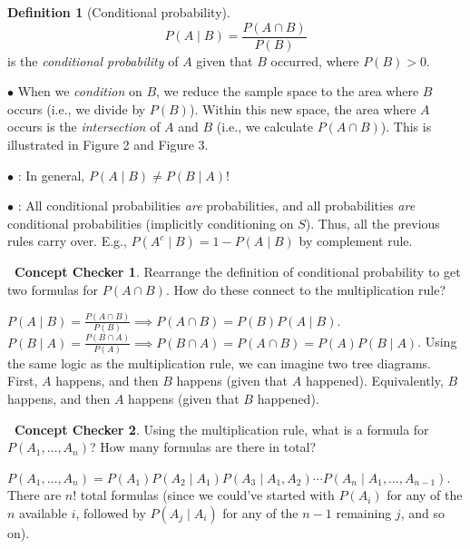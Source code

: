 \documentclass[12pt,oneside]{article}
\newcommand{\tip}{\textbf{\faLightbulb}: }
\newcommand{\warning}{\textbf{\Biohazard}: }
\theoremstyle{definition}
\newtheorem{definition}{Definition}
\newtheorem{concept}{\faPen \ Concept Checker}
\theoremstyle{remark}
\begin{document}
\begin{definition}[Conditional probability]
\[P(A \mid B) = \frac{P(A \cap B)}{P(B)}\] is the \textit{conditional probability} of $A$ given that $B$ occurred, where $P(B) > 0$.

$\bullet$ When we \textit{condition} on $B$, we reduce the sample space to the area where $B$ occurs (i.e., we divide by $P(B)$). Within this new space, the area where $A$ occurs is the \textit{intersection} of $A$ and $B$ (i.e., we calculate $P(A \cap B)$). This is illustrated in Figure 2 and Figure 3.

$\bullet$ \warning In general, $P(A \mid B) \neq P(B \mid A)$!

$\bullet$ \tip All conditional probabilities \textit{are} probabilities, and all probabilities \textit{are} conditional probabilities (implicitly conditioning on $S$). Thus, all the previous rules carry over. E.g., $P(A^c \mid B) = 1 - P(A \mid B)$ by complement rule.
\end{definition}

\begin{concept}
Rearrange the definition of conditional probability to get two formulas for $P(A \cap B)$. How do these connect to the multiplication rule?
\end{concept}

\begin{solutionbox}
$P(A \mid B) = \frac{P(A \cap B)}{P(B)} \implies P(A \cap B) = P(B) P(A \mid B)$. $P(B \mid A) = \frac{P(B \cap A)}{P(A)} \implies P(B \cap A) = P(A \cap B) = P(A) P(B \mid A)$. Using the same logic as the multiplication rule, we can imagine two tree diagrams. First, $A$ happens, and then $B$ happens (given that $A$ happened). Equivalently, $B$ happens, and then $A$ happens (given that $B$ happened).
\end{solutionbox}

\begin{concept}
Using the multiplication rule, what is a formula for $P(A_1, \ldots, A_n)$? How many formulas are there in total?
\end{concept}

\begin{solutionbox}
$P(A_1, \ldots, A_n) = P(A_1) P(A_2 \mid A_1) P(A_3 \mid A_1, A_2) \cdots P(A_n \mid A_1, \ldots, A_{n - 1})$. There are $n!$ total formulas (since we could've started with $P(A_i)$ for any of the $n$ available $i$, followed by $P(A_j \mid A_i)$ for any of the $n - 1$ remaining $j$, and so on).
\end{solutionbox}
\end{document}
